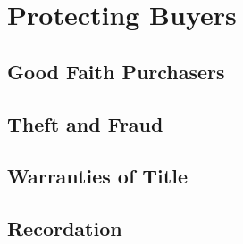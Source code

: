 \chapter{Protecting Buyers}



\section{Good Faith Purchasers}



\begin{questions}

\end{questions}




\begin{questions}

\end{questions}



\section{Theft and Fraud}



\begin{questions}

\end{questions}



\section{Warranties of Title}





\begin{questions}


\end{questions}



\begin{questions}

\end{questions}


\section{Recordation}







\begin{questions}

\end{questions}


